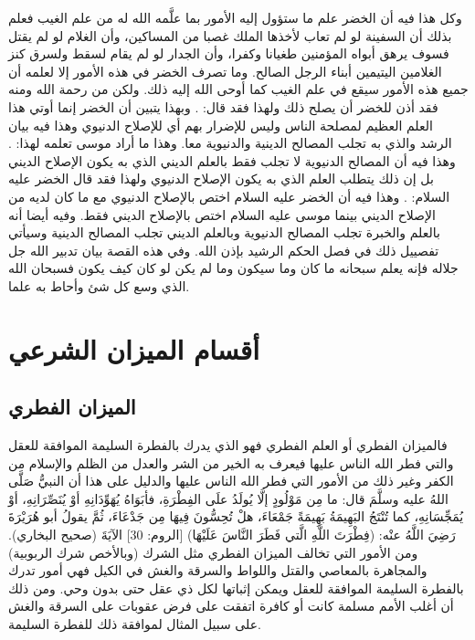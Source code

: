 وكل هذا فيه أن الخضر علم ما ستؤول إليه الأمور بما علَّمه الله له من علم الغيب فعلم بذلك أن السفينة لو لم تعاب لأخذها الملك غصبا من المساكين، وأن الغلام لو لم يقتل فسوف يرهق أبواه المؤمنين طغيانا وكفرا، وأن الجدار لو لم يقام لسقط ولسرق كنز الغلامين اليتيمين أبناء الرجل الصالح. وما تصرف الخضر في هذه الأمور إلا لعلمه أن جميع هذه الأمور سيقع في علم الغيب كما أوحى الله إليه ذلك. ولكن من رحمة الله ومنه فقد أذن للخضر أن يصلح ذلك ولهذا فقد قال: 
\quranayah*[18][82][25]{\footnotesize \surahname*[18]}. وبهذا يتبين أن الخضر إنما أوتي هذا العلم العظيم لمصلحة الناس وليس للإضرار بهم أي للإصلاح الدنيوي وهذا فيه بيان الرشد والذي به تجلب المصالح الدينية والدنيوية معا. وهذا ما أراد موسى تعلمه لهذا: 
\quranayah*[18][66]{\footnotesize \surahname*[18]}. وهذا فيه أن المصالح الدنيوية لا تجلب فقط بالعلم الديني الذي به يكون الإصلاح الديني بل إن ذلك يتطلب العلم الذي به يكون الإصلاح الدنيوي ولهذا فقد قال الخضر عليه السلام: 
 \quranayah*[18][67-68]{\footnotesize \surahname*[18]}. وهذا فيه أن الخضر عليه السلام اختص بالإصلاح الدنيوي مع ما كان لديه من الإصلاح الديني بينما موسى عليه السلام اختص بالإصلاح الديني فقط. وفيه أيضا أنه بالعلم والخبرة تجلب المصالح الدنيوية وبالعلم الديني تجلب المصالح الدينية وسيأتي تفصييل ذلك في فصل الحكم الرشيد بإذن الله. وفي هذه القصة بيان تدبير الله جل جلاله فإنه يعلم سبحانه ما كان وما سيكون وما لم يكن لو كان كيف يكون فسبحان الله الذي وسع كل شئ وأحاط به علما.

\section{أقسام الميزان الشرعي}

\subsection{الميزان الفطري}

فالميزان الفطري أو العلم الفطري فهو الذي يدرك بالفطرة السليمة الموافقة للعقل والتي فطر الله الناس عليها فيعرف به الخير من الشر والعدل من الظلم والإسلام من الكفر وغير ذلك من الأمور التي فطر الله الناس عليها والدليل على هذا أن النبيُّ صَلَّى اللهُ عليه وسلَّمَ قال: ما مِن مَوْلُودٍ إلَّا يُولَدُ علَى الفِطْرَةِ، فأبَوَاهُ يُهَوِّدَانِهِ أوْ يُنَصِّرَانِهِ، أوْ يُمَجِّسَانِهِ، كما تُنْتَجُ البَهِيمَةُ بَهِيمَةً جَمْعَاءَ، هلْ تُحِسُّونَ فِيهَا مِن جَدْعَاءَ، ثُمَّ يقولُ أبو هُرَيْرَةَ رَضِيَ اللَّهُ عنْه: (فِطْرَتَ اللَّهِ الَّتي فَطَرَ النَّاسَ عَلَيْهَا) [الروم: 30] الآيَةَ {\footnotesize (صحيح البخاري)}. ومن الأمور التي تخالف الميزان الفطري مثل الشرك (وبالأخص شرك الربوبية) والمجاهرة بالمعاصي والقتل واللواط والسرقة والغش في الكيل فهي أمور تدرك بالفطرة السليمة الموافقة للعقل ويمكن إثباتها لكل ذي عقل حتى بدون وحي. 
ومن ذلك أن أغلب الأمم مسلمة كانت أو كافرة اتفقت على فرض عقوبات على السرقة والغش على سبيل المثال لموافقة ذلك للفطرة السليمة. 

